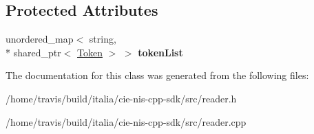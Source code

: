 \subsection*{Protected Attributes}
\begin{DoxyCompactItemize}
\item 
\hypertarget{classnis_1_1interface_1_1Reader_a42d9beab85b111103582f3297fac667b}{unordered\-\_\-map$<$ string, \\*
shared\-\_\-ptr$<$ \hyperlink{classnis_1_1interface_1_1Token}{Token} $>$ $>$ {\bfseries token\-List}}\label{classnis_1_1interface_1_1Reader_a42d9beab85b111103582f3297fac667b}

\end{DoxyCompactItemize}


The documentation for this class was generated from the following files\-:\begin{DoxyCompactItemize}
\item 
/home/travis/build/italia/cie-\/nis-\/cpp-\/sdk/src/reader.\-h\item 
/home/travis/build/italia/cie-\/nis-\/cpp-\/sdk/src/reader.\-cpp\end{DoxyCompactItemize}
